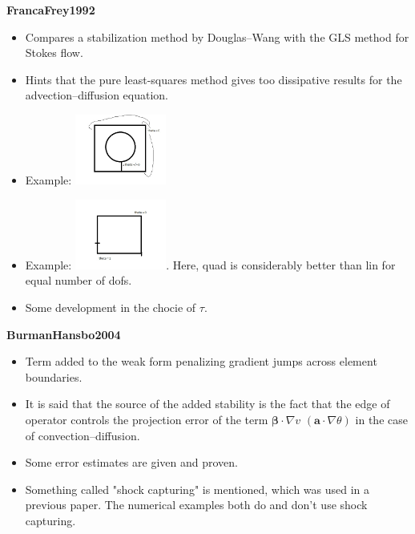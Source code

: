 \documentclass{article}
\newcommand{\bs}[1]{\boldsymbol{#1}}
\begin{document}
\textbf{FrancaFrey1992}
\begin{itemize}
\item Compares a stabilization method by Douglas--Wang with the GLS method for Stokes flow.
\item Hints that the pure least-squares method gives too dissipative results for the advection--diffusion equation.
\item Example: \includegraphics[width=3cm]{figures/FrancaFrey1992_img1.jpg}
\item Example: \includegraphics[width=3cm]{figures/FrancaFrey1992_img2.jpg}. Here, quad is considerably better than lin for equal number of dofs.
\item Some development in the chocie of $\tau$.
\end{itemize}

\textbf{BurmanHansbo2004}
\begin{itemize}
\item Term added to the weak form penalizing gradient jumps across element boundaries.
\item It is said that the source of the added stability is the fact that the edge of operator controls the projection error of the term $\bs{\beta}\cdot\nabla v$ $(\bs{a}\cdot\nabla\theta)$ in the case of convection--diffusion.
\item Some error estimates are given and proven.
\item Something called "shock capturing" is mentioned, which was used in a previous paper. The numerical examples both do and don't use shock capturing.
\end{itemize}
\end{document}

